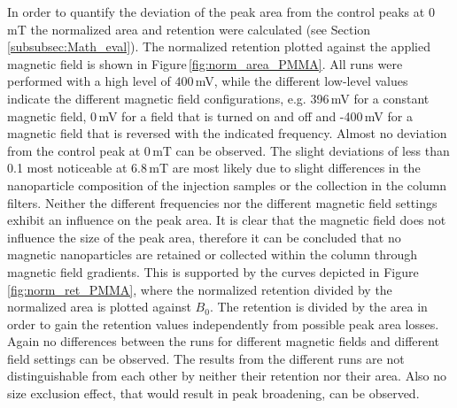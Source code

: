 In order to quantify the deviation of the peak area from the control peaks at 0\,mT the normalized area and retention were calculated (see Section\,\ref{subsubsec:Math_eval}). The normalized retention plotted against the applied magnetic field is shown in Figure\,\ref{fig:norm_area_PMMA}. All runs were performed with a high level of 400\,mV, while the different low-level values indicate the different magnetic field configurations, e.g. 396\,mV for a constant magnetic field, 0\,mV for a field that is turned on and off and -400\,mV for a magnetic field that is reversed with the indicated frequency. Almost no deviation from the control peak at 0\,mT can be observed. The slight deviations of less than 0.1 most noticeable at 6.8\,mT are most likely due to slight differences in the nanoparticle composition of the injection samples or the collection in the column filters. Neither the different frequencies nor the different magnetic field settings exhibit an influence on the peak area. It is clear that the magnetic field does not influence the size of the peak area, therefore it can be concluded that no magnetic nanoparticles are retained or collected within the column through magnetic field gradients. This is supported by the curves depicted in Figure\,\ref{fig:norm_ret_PMMA}, where the normalized retention divided by the normalized area is plotted against $B_{0}$. The retention is divided by the area in order to gain the retention values independently from possible peak area losses. Again no differences between the runs for different magnetic fields and different field settings can be observed. The results from the different runs are not distinguishable from each other by neither their retention nor their area. Also no size exclusion effect, that would result in peak broadening, can be observed.


